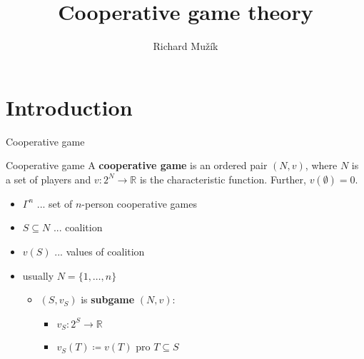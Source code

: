 \documentclass{beamer}
\title{Cooperative game theory}
\author{Richard Mužík}
\institute{richard@imuzik.cz}
\begin{document}

\begin{frame}
	\maketitle %
\end{frame}


\begin{comment}
    - Představit kooperativní hru
    - Cíl: Rozdělení zisku v(N)
    - payoff vektor, imputace
    - jádro (důraz na koaliční racionalitu, tj. vysvětlit, proč je jádro stabilní solution concept)
    - Shapleyho hodnota (pomocí formule i axiomů)
    - třídy her (monotonní, superadditivní, konvexní) a jejich vztahy
\end{comment}


\section{Introduction} %


\begin{frame}{Cooperative game}
    \begin{block}{Cooperative game}
        A \textbf{cooperative game} is an ordered pair $(N,v)$, where $N$ is a set of players and $v\colon 2^N \to \mathbb{R}$ is the characteristic function. Further, $v(\emptyset) = 0$.
    \end{block}
    \begin{itemize}
        \item $\Gamma^n$ ... set of $n$-person cooperative games
        \item $S \subseteq N$ ... coalition
        \item $v(S)$ ... values of coalition
        \item usually $N = \{1,\dots,n\}$
        \begin{itemize}
            \item $(S,v_S)$ is \textbf{subgame} $(N,v)$:
            \begin{itemize}
                \item $v_S \colon 2^S \to \mathbb{R}$
                \item $v_S(T) \coloneqq v(T)$ pro $T \subseteq S$
            \end{itemize}
        \end{itemize}
    \end{itemize}
	
\end{frame}
\end{document}
